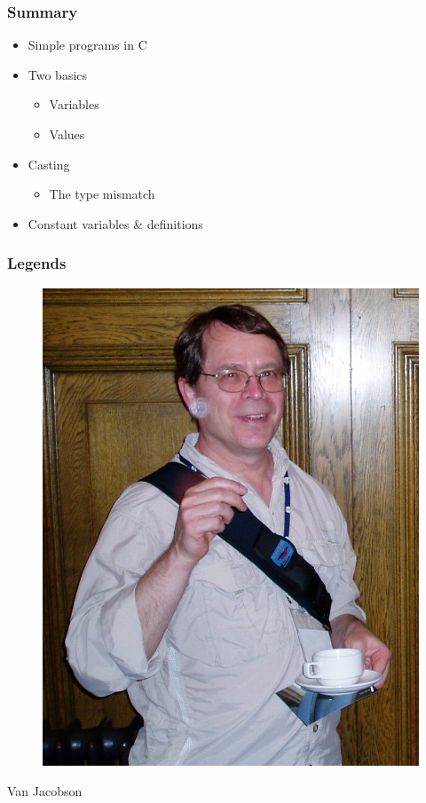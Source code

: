 \documentclass{../c-lecture}
\begin{document}
\begin{frame}
  \frametitle{Summary}
  \begin{itemize}
    \item Simple programs in C
    \item Two basics
    \begin{itemize}
      \item Variables
      \item Values
    \end{itemize}
    \item Casting
    \begin{itemize}
      \item The type mismatch
    \end{itemize}
  \item Constant variables \& definitions
  \end{itemize}
\end{frame}

\begin{frame}
  \frametitle{Legends}
  \begin{figure}
    \includegraphics[height=.75\textheight]{./img/van.jpg}
  \end{figure}
  \pause%
  \centering
  \color{Violet} Van Jacobson
\end{frame}
\end{document}

